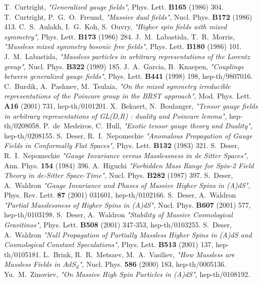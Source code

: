 \documentclass[a4paper,12pt]{article}
\begin{document}
\begin{thebibliography}{99}
T.~Curtright, {\it "Generalized gauge fields",} Phys. Lett. {\bf B165}
(1986) 304.
T.~Curtright, P.~G.~O.~Freund, {\it "Massive dual fields",} Nucl. Phys.
{\bf B172} (1986) 413.
C.~S.~Aulakh, I.~G.~Koh, S.~Ouvry, {\it "Higher spin fields with mixed
symmetry",} Phys. Lett. {\bf B173} (1986) 284.
J.~M.~Labastida, T.~R.~Morris, {\it "Massless mixed symmetry bosonic
free fields",} Phys. Lett. {\bf B180} (1986) 101.
J.~M.~Labastida, {\it "Massless particles in arbitrary representations
of the Lorentz group",} Nucl. Phys. {\bf B322} (1989) 185.
J.~A.~Garcia, B.~Knaepen, {\it "Couplings between generalized gauge
fields",} Phys. Lett. {\bf B441} (1998) 198, hep-th/9807016.
C.~Burdik, A.~Pashnev, M.~Tsulaia, {\it "On the mixed symmetry irreducible
representations of the Poincare group in the BRST approach",} Mod. Phys. Lett.
{\bf A16} (2001) 731, hep-th/0101201.
X.~Bekaert, N.~Boulanger, {\it "Tensor gauge fields in arbitrary
representations of GL(D,R) : duality and Poincare lemma", } hep-th/0208058.
P.~de~Medeiros, C.~Hull, {\it "Exotic tensor gauge theory and Duality", }
hep-th/0208155.
S.~Deser, R.~I.~Nepomechie {\it "Anomalous Propagation of Gauge Fields
in Conformally Flat Spaces",} Phys. Lett. {\bf B132} (1983) 321.
S.~Deser, R.~I.~Nepomechie {\it "Gauge Invariance versus Masslessness
in de Sitter Spaces",} Ann. Phys. {\bf 154} (1984) 396.
A.~Higuchi {\it "Forbidden Mass Range for Spin-2 Field Theory in
de-Sitter Space-Time",} Nucl. Phys. {\bf B282} (1987) 397.
S.~Deser, A.~Waldron {\it "Gauge Invariance and Phases of Massive
Higher Spins in (A)dS",} Phys. Rev. Lett. {\bf 87} (2001) 031601,
hep-th/0102166.
S.~Deser, A.~Waldron {\it "Partial Masslessness of Higher Spins in
(A)dS",} Nucl. Phys. {\bf B607} (2001) 577, hep-th/0103198.
S.~Deser, A.~Waldron {\it "Stability of Massive Cosmological
Gravitinos",} Phys. Lett. {\bf B508} (2001) 347-353, hep-th/0103255.
S.~Deser, A.~Waldron {\it "Null Propagation of Partially Massless
Higher Spins in (A)dS and Cosmological Constant Speculations",}
Phys. Lett. {\bf B513} (2001) 137, hep-th/0105181.
L.~Brink, R.~R.~Metsaev, M.~A.~Vasiliev, {\it "How Massless are Massless
Fields in $AdS_d$",} Nucl. Phys. {\bf 586} (2000) 183, hep-th/0005136.
Yu.~M.~Zinoviev, {\it "On Massive High Spin Particles in (A)dS",}
hep-th/0108192.
\end{thebibliography}
\end{document}
